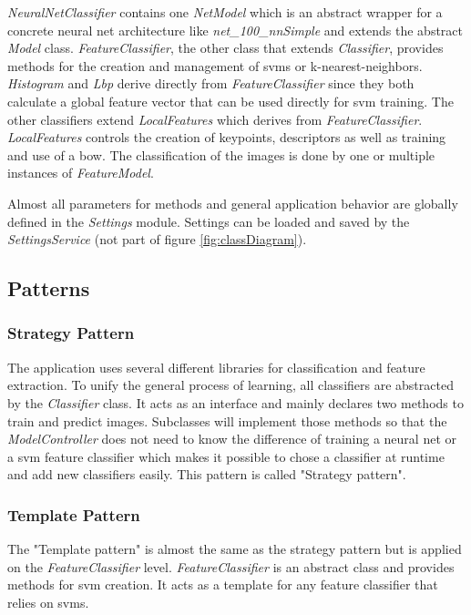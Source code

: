 	\textit{NeuralNetClassifier} contains one \textit{NetModel} which is an abstract wrapper for a concrete neural net architecture like \textit{net\_100\_nnSimple} and extends the abstract \textit{Model} class. \textit{FeatureClassifier}, the other class that extends \textit{Classifier}, provides methods for the creation and management of \glspl{svm} or k-nearest-neighbors. \textit{Histogram} and \textit{Lbp} derive directly from \textit{FeatureClassifier} since they both calculate a global feature vector that can be used directly for \gls{svm} training. The other classifiers extend \textit{LocalFeatures} which derives from \textit{FeatureClassifier}. \textit{LocalFeatures} controls the creation of keypoints, descriptors as well as training and use of a \gls{bow}. The classification of the images is done by one or multiple instances of \textit{FeatureModel}.
	
	Almost all parameters for methods and general application behavior are globally defined in the \textit{Settings} module. Settings can be loaded and saved by the \textit{SettingsService} {(not part of figure \ref{fig:classDiagram})}.
	
	\subsection{Patterns}
	
		\subsubsection*{Strategy Pattern}
		The application uses several different libraries for classification and feature extraction. To unify the general process of learning, all classifiers are abstracted by the \textit{Classifier} class. It acts as an interface and mainly declares two methods to train and predict images. Subclasses will implement those methods so that the \textit{ModelController} does not need to know the difference of training a neural net or a \gls{svm} feature classifier which makes it possible to chose a classifier at runtime and add new classifiers easily. This pattern is called "Strategy pattern".
	
		\subsubsection*{Template Pattern}
		The "Template pattern" is almost the same as the strategy pattern but is applied on the \textit{FeatureClassifier} level. \textit{FeatureClassifier} is an abstract class and provides methods for \gls{svm} creation. It acts as a template for any feature classifier that relies on \glspl{svm}. 
		
